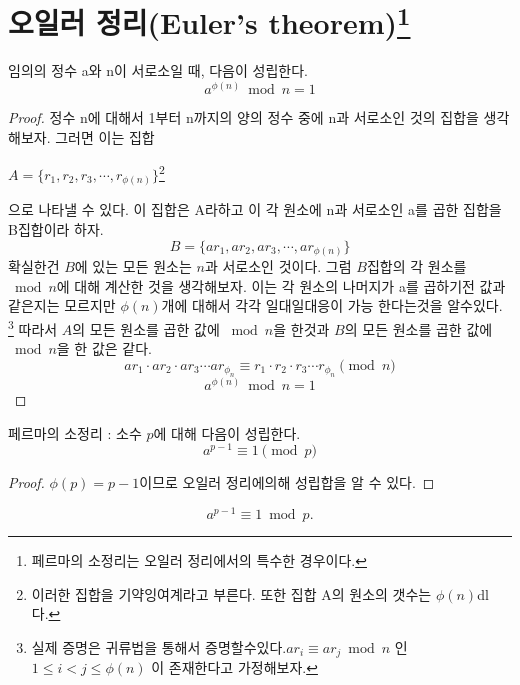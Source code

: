 {\section{오일러 정리(Euler's theorem)\protect\footnote{페르마의 소정리는 오일러 정리에서의 특수한 경우이다.}}

\begin{justbox}
    \begin{theorem}
        임의의 정수 a와 n이 서로소일 때, 다음이 성립한다.
        \[a^{\phi(n)} \bmod n = 1\]
    \end{theorem}
\end{justbox}

\begin{proof}
    
정수 n에 대해서 1부터 n까지의 양의 정수 중에 n과 서로소인 것의 집합을 생각해보자.
그러면 이는 집합
\begin{center}
    $A = \{ r_1 ,r_2,r_3, \cdots ,r_{\phi(n)}\}$\footnote{이러한 집합을 기약잉여계라고 부른다. 또한 집합 A의 원소의 갯수는 $\phi(n)$dl다.}
\end{center}
으로 나타낼 수 있다. 이 집합은 A라하고 이 각 원소에 n과 서로소인 a를 곱한 집합을 B집합이라 하자.
\[B = \{ ar_1 ,ar_2,ar_3, \cdots ,ar_{\phi(n)}\} \]
확실한건 $B$에 있는 모든 원소는 $n$과 서로소인 것이다. 
그럼 $B$집합의 각 원소를 $\bmod n$에 대해 계산한 것을 생각해보자.
 이는 각 원소의 나머지가 a를 곱하기전 값과 같은지는 모르지만 $\phi(n)$개에 대해서 각각 일대일대응이 가능 한다는것을 알수있다.
  \footnote{실제 증명은 귀류법을 통해서 증명할수있다.$ar_i  \equiv ar_j \bmod n $ 인 $1 \le i < j \le \phi(n)$ 이 존재한다고 가정해보자.}
따라서 $A$의 모든 원소를 곱한 값에 $\bmod n$을 한것과 $B$의 모든 원소를 곱한 값에 $\bmod n$을 한 값은 같다.
\[ar_1 \cdot ar_2 \cdot ar_3 \cdots ar_{\phi_{n}} \equiv r_1 \cdot r_2 \cdot r_3 \cdots r_{\phi_{n}} \pmod n\]
\[a^{\phi(n)}\bmod n= 1\]
\end{proof}


\begin{corollary}
    페르마의 소정리 :  소수 $p$에 대해 다음이 성립한다.
    $$ a^{p-1} \equiv 1 \pmod{p}$$
\end{corollary}

\begin{proof}
    $\phi(p)  = p-1 $이므로 오일러 정리에의해 성립합을 알 수 있다.
\end{proof}


\begin{equation*}
    a^{p-1} \equiv 1 \bmod p.
\end{equation*}

}
